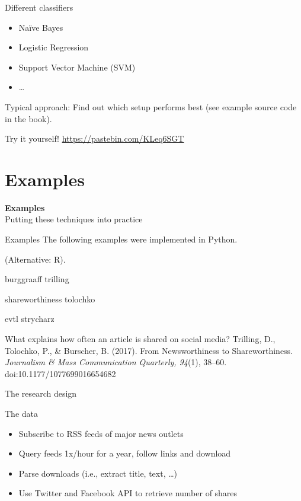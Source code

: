 \documentclass{beamer}
\begin{document}
		\begin{frame}{Different classifiers}
			\begin{itemize}
				\item Naïve Bayes
				\item Logistic Regression
				\item Support Vector Machine (SVM)
				\item \ldots
			\end{itemize}
			Typical approach: Find out which setup performs best (see example source code in the book).
		\end{frame}
		
		
		\begin{frame}{Try it yourself!}
			\huge
			\url{https://pastebin.com/KLeq6SGT}
		\end{frame}

\section{Examples}
\begin{frame}
	\textbf{Examples} \\
	Putting these techniques into practice
\end{frame}


\begin{frame}{Examples}
The following examples were implemented in Python.

(Alternative: R).

	burggraaff trilling
	
	shareworthiness tolochko
	
	
	evtl strycharz
	

\end{frame}


\begin{frame}{What explains how often an article is shared on social media?}
Trilling, D., Tolochko, P., \& Burscher, B. (2017). From Newsworthiness to Shareworthiness. \textit{Journalism \& Mass Communication Quarterly, 94}(1), 38–60. doi:10.1177/1077699016654682
\end{frame}


\begin{frame}{The research design}
\begin{block}{The data}
	\begin{itemize}
		\item Subscribe to RSS feeds of major news outlets
		\item Query feeds 1x/hour for a year, follow links and download
		\item Parse downloads (i.e., extract title, text, \ldots)
		\item Use Twitter and Facebook API to retrieve number of shares
	\end{itemize}
\end{block}
\end{frame}
\end{document}
